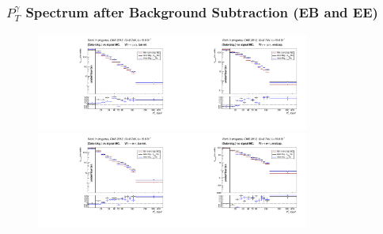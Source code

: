\begin{frame}\frametitle{\footnotesize{$P_T^{\gamma}$ Spectrum after Background Subtraction (EB and EE)}}
  
  \begin{figure}[htb]
    \begin{center}    
       \includegraphics[width=0.40\textwidth]{../figs/figs_v11/MUON_WGamma/PrepareYields/c_BkgSubtrDATAvsSIGMC_c_MUON_WGamma__UNblind__Barrel__phoEt.pdf}\includegraphics[width=0.40\textwidth]{../figs/figs_v11/MUON_WGamma/PrepareYields/c_BkgSubtrDATAvsSIGMC_c_MUON_WGamma__UNblind__Endcap__phoEt.pdf}\\
       \includegraphics[width=0.40\textwidth]{../figs/figs_v11/ELECTRON_WGamma/PrepareYields/c_BkgSubtrDATAvsSIGMC_c_ELECTRON_WGamma__UNblind__Barrel__phoEt.pdf}\includegraphics[width=0.40\textwidth]{../figs/figs_v11/ELECTRON_WGamma/PrepareYields/c_BkgSubtrDATAvsSIGMC_c_ELECTRON_WGamma__UNblind__Endcap__phoEt.pdf}\\
    \end{center}
  \end{figure}
\end{frame}%

